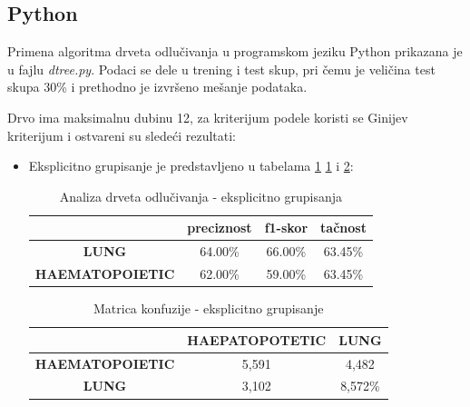 \documentclass[a4paper]{article}
\begin{document}
\subsection{Python}

Primena algoritma drveta odlučivanja u programskom jeziku Python prikazana je u fajlu \textit{dtree.py}. Podaci se dele u trening i test skup, pri čemu je veličina test skupa 30\% i prethodno je izvršeno mešanje podataka. 



Drvo ima maksimalnu dubinu 12, za kriterijum podele koristi se Ginijev kriterijum i ostvareni su sledeći rezultati:

\begin{itemize}
    \item Eksplicitno grupisanje je predstavljeno u tabelama \ref{tab:analiza_drveta1} \ref{tab:analiza_drveta1} i \ref{tab:konfuzija_drvo1}:
        \begin{table}[ht!]
            \begin{center}
            \caption{Analiza drveta odlučivanja - eksplicitno grupisanja}
            \label{tab:analiza_drveta1}
            \begin{tabular}{c|c|c|c} \hline
            & \textbf{preciznost} & \textbf{f1-skor} & \textbf{tačnost}\\ \hline
            \textbf{LUNG} & 64.00\% & 66.00\% & 63.45\%\\ \hline
            \textbf{HAEMATOPOIETIC} & 62.00\% & 59.00\% & 63.45\%\\ \hline
            \end{tabular}
            \end{center}
        \end{table}
        
        \begin{table}[ht!]
            \begin{center}
            \caption{Matrica konfuzije - eksplicitno grupisanje}
            \label{tab:konfuzija_drvo1}
            \begin{tabular}{c|c|c} \hline
            & \textbf{HAEPATOPOTETIC} & \textbf{LUNG}\\ \hline
            \textbf{HAEMATOPOIETIC} & 5,591 & 4,482\\ \hline
            \textbf{LUNG} & 3,102 & 8,572\% \\ \hline
            \end{tabular}
            \end{center}
        \end{table}
        

\end{itemize}
\end{document}
